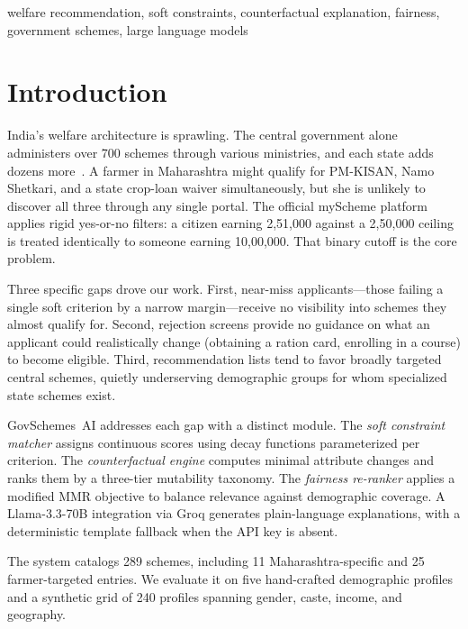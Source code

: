 \documentclass[conference]{IEEEtran}
\newcommand{\rupee}{\textrm{\textup{\text{\textrm{Rs.}}}}}
\begin{document}
\begin{IEEEkeywords}
welfare recommendation, soft constraints, counterfactual explanation, fairness, government schemes, large language models
\end{IEEEkeywords}

\section{Introduction}

India's welfare architecture is sprawling. The central government alone administers over 700 schemes through various ministries, and each state adds dozens more~\cite{saxena2019welfare}. A farmer in Maharashtra might qualify for PM-KISAN, Namo Shetkari, and a state crop-loan waiver simultaneously, but she is unlikely to discover all three through any single portal. The official myScheme platform~\cite{myScheme2024} applies rigid yes-or-no filters: a citizen earning \rupee2,51,000 against a \rupee2,50,000 ceiling is treated identically to someone earning \rupee10,00,000. That binary cutoff is the core problem.

Three specific gaps drove our work. First, near-miss applicants---those failing a single soft criterion by a narrow margin---receive no visibility into schemes they almost qualify for. Second, rejection screens provide no guidance on what an applicant could realistically change (obtaining a ration card, enrolling in a course) to become eligible. Third, recommendation lists tend to favor broadly targeted central schemes, quietly underserving demographic groups for whom specialized state schemes exist.

GovSchemes~AI addresses each gap with a distinct module. The \textit{soft constraint matcher} assigns continuous scores using decay functions parameterized per criterion. The \textit{counterfactual engine} computes minimal attribute changes and ranks them by a three-tier mutability taxonomy. The \textit{fairness re-ranker} applies a modified MMR objective to balance relevance against demographic coverage. A Llama-3.3-70B integration via Groq generates plain-language explanations, with a deterministic template fallback when the API key is absent.

The system catalogs 289 schemes, including 11 Maharashtra-specific and 25 farmer-targeted entries. We evaluate it on five hand-crafted demographic profiles and a synthetic grid of 240 profiles spanning gender, caste, income, and geography.
\end{document}
